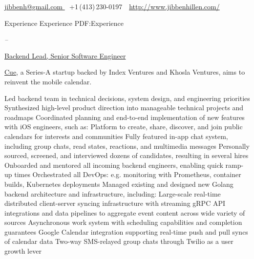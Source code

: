 \documentclass[letterpaper,nonstopmode]{simpleresumecv}
\newcommand{\CVAuthor}{Jibben Hillen}
\newcommand{\CVWebpage}{http://www.jibbenhillen.com/}
\begin{document}

\Title{\CVAuthor}

\begin{SubTitle}
\href{mailto:jibbenh@gmail.com}
{jibbenh@gmail.com }
\,\SubBulletSymbol\,
+1\,(413)\,230-0197
\,\SubBulletSymbol\,
\href{\CVWebpage}
{\url{\CVWebpage}}
\end{SubTitle}

\begin{Body}
\thispagestyle{empty}


\Section
{Experience}
{Experience}
{PDF:Experience}

\Entry
{}
\hfill \textit{ -- }
\SmallGap
\begin{Position}\underline{Backend Lead, Senior Software Engineer}\end{Position}
\Gap
\begin{Detail} \href{https://www.cue.app}{Cue}, a Series-A startup backed by Index Ventures and Khosla Ventures, aims to reinvent the mobile calendar.
\end{Detail}
\SmallGap
\BulletItem Led backend team in technical decisions, system design, and engineering priorities
\BulletItem Synthesized high-level product direction into manageable technical projects and roadmaps
\BulletItem Coordinated planning and end-to-end implementation of new features with iOS engineers, such as:
\SubBulletItem Platform to create, share, discover, and join public calendars for interests and communities
\SubBulletItem Fully featured in-app chat system, including group chats, read states, reactions, and multimedia messages
\BulletItem Personally sourced, screened, and interviewed dozens of candidates, resulting in several hires
\BulletItem Onboarded and mentored all incoming backend engineers, enabling quick ramp-up times
\BulletItem Orchestrated all DevOps: e.g. monitoring with Prometheus, container builds, Kubernetes deployments
\BulletItem Managed existing and designed new Golang backend architecture and infrastructure, including:
\SubBulletItem Large-scale real-time distributed client-server syncing infrastructure with streaming gRPC
\SubBulletItem API integrations and data pipelines to aggregate event content across wide variety of sources
\SubBulletItem Asynchronous work system with scheduling capabilities and completion guarantees
\SubBulletItem Google Calendar integration supporting real-time push and pull syncs of calendar data
\SubBulletItem Two-way SMS-relayed group chats through Twilio as a user growth lever
\BigGap


\end{Body}
\end{document}
